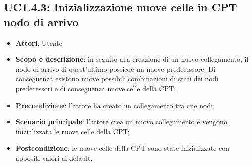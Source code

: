 \subsection{UC1.4.3: Inizializzazione nuove celle in CPT nodo di arrivo} 
\hypertarget{UC1.4.3}{} 
\begin{itemize} 
	\item{\textbf{Attori}: Utente;} 
	\item{\textbf{Scopo e descrizione}: in seguito alla creazione di un nuovo collegamento, il nodo di arrivo di quest'ultimo possiede un nuovo predecessore. Di conseguenza esistono nuove possibili combinazioni di stati dei nodi predecessori e di conseguenza nuove celle della CPT;} 
	\item{\textbf{Precondizione}: l'attore ha creato un collegamento tra due nodi;} 
	\item{\textbf{Scenario principale}: l'attore crea un nuovo collegamento e vengono inizializzata le nuove celle della CPT;}
	\item{\textbf{Postcondizione}: le nuove celle della CPT sono state inizializzate con appositi valori di default.} 
\end{itemize} 
